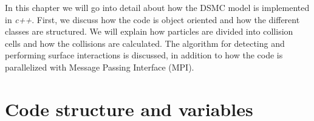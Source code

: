 In this chapter we will go into detail about how the DSMC model is implemented in \textit{c++}. First, we discuss how the code is object oriented and how the different classes are structured. We will explain how particles are divided into collision cells and how the collisions are calculated. The algorithm for detecting and performing surface interactions is discussed, in addition to how the code is parallelized with Message Passing Interface (MPI). 
\section{Code structure and variables}
